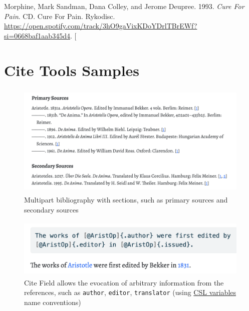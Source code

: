 \documentclass[
  12pt,
  a4paper,
  oneside,
  numbers=noenddot,
  titlepage,
  toclink=all,
  toc=bibliography]{scrbook}
\newlength{\cslhangindent}
\newlength{\cslentryspacingunit} %
\newenvironment{CSLReferences}[2] %
 {%
  \setlength{\parindent}{0pt}
  \ifodd #1
  \let\oldpar\par
  \def\par{\hangindent=\cslhangindent\oldpar}
  \fi
  \setlength{\parskip}{#2\cslentryspacingunit}
 }%
 {}
\theoremstyle{definition}
\theoremstyle{definition}
\theoremstyle{definition}
\theoremstyle{plain}
\theoremstyle{plain}
\theoremstyle{plain}
\theoremstyle{plain}
\theoremstyle{plain}
\theoremstyle{remark}
\begin{document}
\hypertarget{refs_scriv164}{}
\begin{CSLReferences}{1}{0}
\leavevmode{}%
Morphine, Mark Sandman, Dana Colley, and Jerome Deupree. 1993.
\emph{Cure For Pain}. CD. Cure For Pain. Rykodisc.
\url{https://open.spotify.com/track/3hO9gaVixKDoYDrlTBrEWf?si=0668baf1aab345d4}.
{[}\Acrobatmenu{GoBack}{$\hookleftarrow$}{]}

\end{CSLReferences}

\hypertarget{sec-scriv165}{%
\chapter*{Cite Tools Samples}\label{sec-scriv165}}

\protect\hypertarget{scriv165}{}{}

\begin{figure}

{\centering \includegraphics[width=4.70833in,height=2.15625in]{multipartbibliography.png}

}

\caption{\label{fig-scriv165A}Multipart bibliography with sections, such
as primary sources and secondary sources}

\end{figure}

\begin{figure}

{\centering \includegraphics[width=4.75in,height=1.125in]{citefield.png}

}

\caption{\label{fig-scriv165B}Cite Field allows the evocation of
arbitrary information from the references, such as \texttt{author},
\texttt{editor}, \texttt{translator} (using
\href{https://docs.citationstyles.org/en/stable/specification.html\#appendix-iv-variables}{CSL
variables} name conventions)}

\end{figure}
\end{document}
